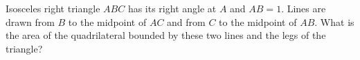 Isosceles right triangle $ABC$ has its right angle at $A$ and $AB=1$. Lines are drawn from $B$ to the midpoint of $AC$ and from $C$ to the midpoint of $AB$. What is the area of the quadrilateral bounded by these two lines and the legs of the triangle?
